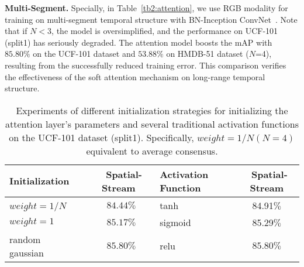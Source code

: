 \documentclass[runningheads,a4paper]{llncs}
\begin{document}
\noindent \textbf{Multi-Segment.}
Specially, in Table~\ref{tb2:attention},
we use RGB modality for training on multi-segment temporal structure with BN-Inception ConvNet~\cite{ioffe2015batch}. Note that if $N<3$, the model is oversimplified, and the performance on UCF-101 (split1) has seriously degraded. The attention model boosts the mAP with $85.80\%$ on the UCF-101 dataset and $53.88\%$ on HMDB-51 dataset ($N$=4),
resulting from the successfully reduced training error. This comparison verifies the effectiveness of the soft attention mechanism on long-range temporal structure.
%
\begin{table*}[t]
	\caption{Experiments of different initialization strategies for initializing the attention
		layer's parameters and several traditional activation functions on the UCF-101 dataset (split1).
		Specifically, $weight=1/N(N=4)$ equivalent to average consensus.}
	\label{tb3:initialization}
	\begin{center}
		\begin{small}
			\begin{tabular}{lc|lc}
				\toprule
				Initialization & ~Spatial-Stream~ & Activation Function~ & ~Spatial-Stream \\
				\midrule
				$weight=1/N$~~ & $ 84.44\% $ & tanh & 84.91$ \% $ \\
				$weight=1$ &  $ 85.17\% $ & sigmoid & 85.29$ \% $ \\
				random gaussian~~~~~	 & $ \mathbf{85.80}\% $ & relu~~~~~~~ & $ \mathbf{85.80}\% $ \\
				\bottomrule
			\end{tabular}
		\end{small}
	\end{center}
\end{table*}
%
\end{document}
